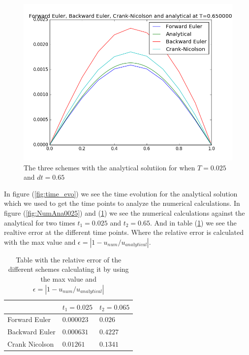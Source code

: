\documentclass[a4paper,10pt]{article}
\begin{document}
\begin{figure}
  \includegraphics[scale=0.5]{numerical_analytcal_T065}
    \caption{The three schemes with the analytical solutiion for when $T = 0.025$ and $dt = 0.65$}
    \label{fig:NumAna065}
\end{figure}

In figure (\ref{fig:time_evo}) we see the time evolution for the analytical solution which we used to get the time points to analyze the numerical 
calculations.
In figure (\ref{fig:NumAna0025}) and (\ref{fig:NumAna065}) we see the numerical calculations against the analytical for two times $t_1 = 0.025$
and $t_2 = 0.65$. And in table (\ref{tab:RelError}) we see the realtive error at the different time points. Where the relative error is
calculated with the max value and $\epsilon = |1-u_{num}/u_{anałytical}|$.

\begin{table}
\centering
\caption{Table with the relative error of the different schemes calculating it by using the max value and $\epsilon =|1-u_{num}/u_{anałytical}|$ }
\label{tab:RelError}
\begin{tabular}{|l|l|l|}
\hline
 & $t_1=0.025$ & $t_2=0.065$ \\ \hline
Forward Euler & $0.000023$ & $0.026$ \\ \hline
Backward Euler & $0.000631$ & $0.4227$ \\ \hline
Crank Nicolson & $0.01261$  & $0.1341$ \\ \hline
\end{tabular}
\end{table}
\end{document}
